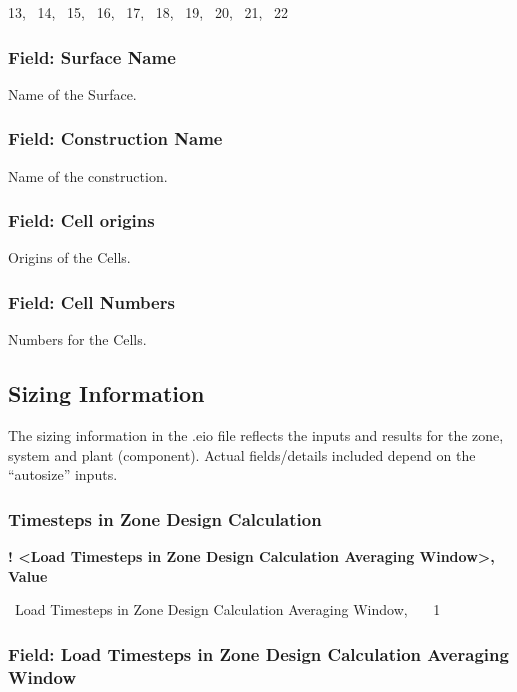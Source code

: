 13,~ 14,~ 15,~ 16,~ 17,~ 18,~ 19,~ 20,~ 21,~ 22

\subsubsection{Field: Surface Name}\label{field-surface-name-1}

Name of the Surface.

\subsubsection{Field: Construction Name}\label{field-construction-name-3}

Name of the construction.

\subsubsection{Field: Cell origins}\label{field-cell-origins}

Origins of the Cells.

\subsubsection{Field: Cell Numbers}\label{field-cell-numbers}

Numbers for the Cells.

\subsection{Sizing Information}\label{sizing-information}

The sizing information in the .eio file reflects the inputs and results for the zone, system and plant (component). Actual fields/details included depend on the ``autosize'' inputs.

\subsubsection{Timesteps in Zone Design Calculation}\label{timesteps-in-zone-design-calculation}

\textbf{! \textless{}Load Timesteps in Zone Design Calculation Averaging Window\textgreater{}, Value}

~Load Timesteps in Zone Design Calculation Averaging Window,~~~ 1

\subsubsection{Field: Load Timesteps in Zone Design Calculation Averaging Window}\label{field-load-timesteps-in-zone-design-calculation-averaging-window}

